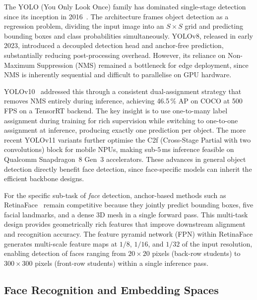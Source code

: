 \documentclass[conference, 10pt]{IEEEtran}
\begin{document}
The YOLO (You Only Look Once) family has dominated single-stage detection since its inception
in 2016~\cite{ref_yolo_origin}.  The architecture frames object detection as a regression
problem, dividing the input image into an $S \times S$ grid and predicting bounding boxes and
class probabilities simultaneously.  YOLOv8, released in early 2023, introduced a decoupled
detection head and anchor-free prediction, substantially reducing post-processing overhead.
However, its reliance on Non-Maximum Suppression (NMS) remained a bottleneck for edge
deployment, since NMS is inherently sequential and difficult to parallelise on GPU hardware.

YOLOv10~\cite{ref_yolov10} addressed this through a consistent dual-assignment strategy that
removes NMS entirely during inference, achieving 46.5\,\% AP on COCO at
500\,FPS on a TensorRT backend.  The key insight is to use one-to-many label assignment during
training for rich supervision while switching to one-to-one assignment at inference, producing
exactly one prediction per object.  The more recent YOLOv11 variants further optimise the
C2f (Cross-Stage Partial with two convolutions) block for mobile NPUs, making sub-$5$\,ms
inference feasible on Qualcomm Snapdragon~8 Gen~3 accelerators.  These advances in general
object detection directly benefit face detection, since face-specific models can inherit the
efficient backbone designs.

For the specific sub-task of \emph{face} detection, anchor-based methods such as
RetinaFace~\cite{ref_retinaface} remain competitive because they jointly predict bounding
boxes, five facial landmarks, and a dense 3D mesh in a single forward pass.  This multi-task
design provides geometrically rich features that improve downstream alignment and recognition
accuracy.  The feature pyramid network (FPN) within RetinaFace generates multi-scale feature
maps at $1/8$, $1/16$, and $1/32$ of the input resolution, enabling detection of faces ranging
from $20 \times 20$ pixels (back-row students) to $300 \times 300$ pixels (front-row students)
within a single inference pass.

\subsection{Face Recognition and Embedding Spaces}
\end{document}
